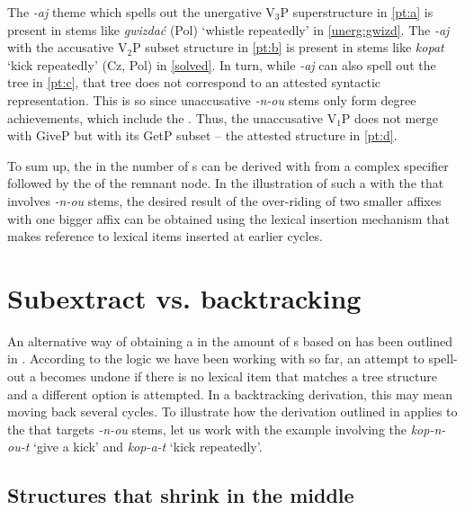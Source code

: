 \noindent
The \textit{-aj} theme  which spells out the unergative V$_{3}$P superstructure in \ref{pt:a} is present in stems like \textit{gwizda\'c} (Pol) `whistle repeatedly' in \ref{unerg:gwizd}. The \textit{-aj} with the accusative V$_{2}$P subset structure in \ref{pt:b} is present in stems like \textit{kopat} `kick repeatedly' (Cz, Pol) in \ref{solved}. 
In turn, while \textit{-aj} can also spell out the tree in \ref{pt:c}, that tree does not correspond to an attested syntactic representation. This is so since unaccusative \textit{-n-ou} stems only form degree achievements, which include the . Thus, the unaccusative V$_{1}$P does not merge with GiveP but with its GetP subset -- the attested structure in \ref{pt:d}.
\par
To sum up, the  in the number of s can be derived with  from a complex specifier followed by the  of the remnant node. In the illustration of such a  with the  that involves \textit{-n-ou} stems, the desired result of the over-riding of two smaller affixes  with one bigger affix can be obtained using the lexical insertion mechanism that makes reference to lexical items inserted at earlier cycles. 

\section{Subextract vs. backtracking}

An alternative way of obtaining a  in the amount of s based on  has been outlined in .  According to the  logic we have been working with so far, an attempt to spell-out a  becomes undone if there is no lexical item that matches a tree structure and a different  option is attempted. In a backtracking derivation, this may mean moving back several cycles. To illustrate how the  derivation outlined in  applies to the  that targets \textit{-n-ou} stems, let us work with the example involving the  \textit{kop-n-ou-t} `give a kick' and \textit{kop-a-t} `kick repeatedly'.

\subsection{Structures that shrink  in the middle}

